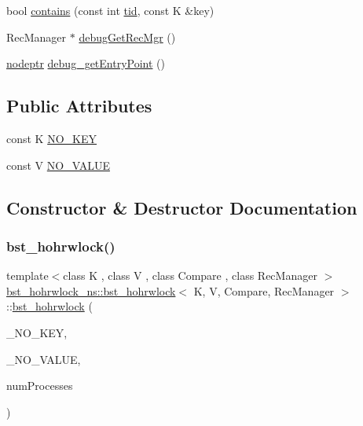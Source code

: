 \begin{DoxyCompactItemize}
\item 
bool \hyperlink{classbst__hohrwlock__ns_1_1bst__hohrwlock_a44fc6dba42ab1f4ea18d6576863c5171}{contains} (const int \hyperlink{microbench_2main_8cpp_a9ca9869868fe7e7a38a921cc7de4103f}{tid}, const K \&key)
\item 
Rec\+Manager $\ast$ \hyperlink{classbst__hohrwlock__ns_1_1bst__hohrwlock_a990501110597111d6aafc3b7a48a924d}{debug\+Get\+Rec\+Mgr} ()
\item 
\hyperlink{bst__rwlock__impl_8h_a04158d2a20768fe447133ff555823b05}{nodeptr} \hyperlink{classbst__hohrwlock__ns_1_1bst__hohrwlock_ab9d0773edc32cc5ca013f5088e923e8c}{debug\+\_\+get\+Entry\+Point} ()
\end{DoxyCompactItemize}
\subsection*{Public Attributes}
\begin{DoxyCompactItemize}
\item 
const K \hyperlink{classbst__hohrwlock__ns_1_1bst__hohrwlock_af518cc20774b8b40621b298ad7a095e4}{N\+O\+\_\+\+K\+EY}
\item 
const V \hyperlink{classbst__hohrwlock__ns_1_1bst__hohrwlock_a2e84b829c70c83ad82c2191cb90ce7a9}{N\+O\+\_\+\+V\+A\+L\+UE}
\end{DoxyCompactItemize}


\subsection{Constructor \& Destructor Documentation}
\mbox{\label{classbst__hohrwlock__ns_1_1bst__hohrwlock_a2971cc13e0041afd83bd6f0393b66e55}} 
\subsubsection{\texorpdfstring{bst\+\_\+hohrwlock()}{bst\_hohrwlock()}}
{\footnotesize\ttfamily template$<$class K , class V , class Compare , class Rec\+Manager $>$ \\
\hyperlink{classbst__hohrwlock__ns_1_1bst__hohrwlock}{bst\+\_\+hohrwlock\+\_\+ns\+::bst\+\_\+hohrwlock}$<$ K, V, Compare, Rec\+Manager $>$\+::\hyperlink{classbst__hohrwlock__ns_1_1bst__hohrwlock}{bst\+\_\+hohrwlock} (\begin{DoxyParamCaption}\item[{const K}]{\+\_\+\+N\+O\+\_\+\+K\+EY,  }\item[{const V}]{\+\_\+\+N\+O\+\_\+\+V\+A\+L\+UE,  }\item[{const int}]{num\+Processes }\end{DoxyParamCaption})\hspace{0.3cm}{\ttfamily [inline]}}


